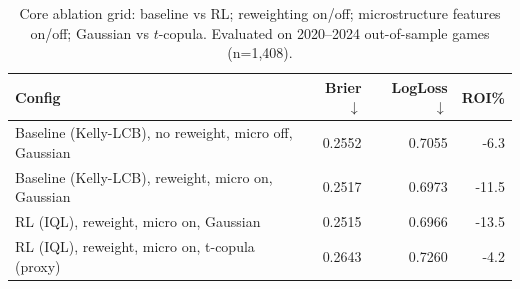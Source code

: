 \begin{table}[t]
  \centering
  \small
  \caption[Core ablation grid]{Core ablation grid: baseline vs RL; reweighting on/off; microstructure features on/off; Gaussian vs $t$-copula. Evaluated on 2020--2024 out-of-sample games (n=1,408).}
  \label{tab:core-ablation}
  \setlength{\tabcolsep}{3pt}\renewcommand{\arraystretch}{1.12}
  \begin{tabular}{@{} l r r r @{} }
    \toprule
    \textbf{Config}  & \textbf{Brier $\downarrow$}  & \textbf{LogLoss $\downarrow$}  & \textbf{ROI\%} \\
    \midrule
    Baseline (Kelly-LCB), no reweight, micro off, Gaussian & 0.2552 & 0.7055 & -6.3 \\
    Baseline (Kelly-LCB), reweight, micro on, Gaussian & 0.2517 & 0.6973 & -11.5 \\
    RL (IQL), reweight, micro on, Gaussian & 0.2515 & 0.6966 & -13.5 \\
    RL (IQL), reweight, micro on, t-copula (proxy) & 0.2643 & 0.7260 & -4.2 \\
    \bottomrule
  \end{tabular}
\end{table}
